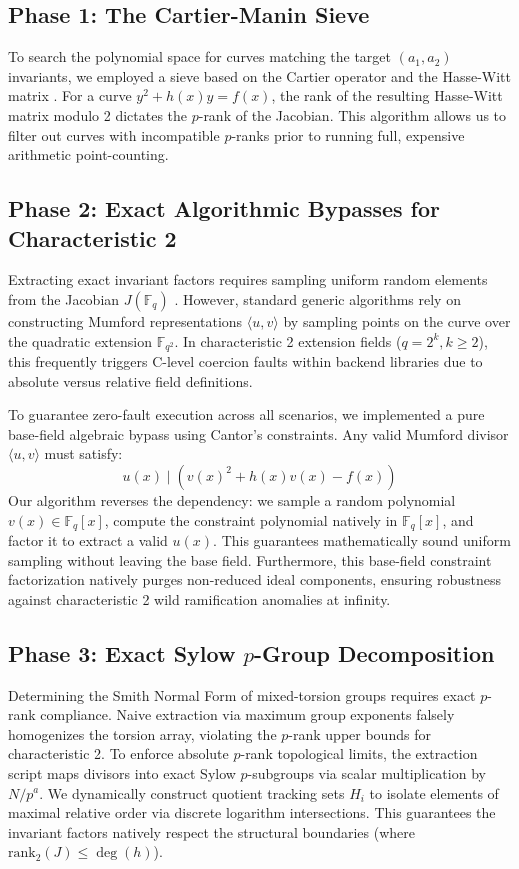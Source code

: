 \documentclass[letterpaper, 11pt]{article}
\begin{document}
\subsection{Phase 1: The Cartier-Manin Sieve}
To search the polynomial space for curves matching the target $(a_1, a_2)$ invariants, we employed a sieve based on the Cartier operator \cite{Cartier1958} and the Hasse-Witt matrix \cite{Manin1963}. For a curve $y^2 + h(x)y = f(x)$, the rank of the resulting Hasse-Witt matrix modulo 2 dictates the $p$-rank of the Jacobian. This algorithm allows us to filter out curves with incompatible $p$-ranks prior to running full, expensive arithmetic point-counting.

\subsection{Phase 2: Exact Algorithmic Bypasses for Characteristic 2}
Extracting exact invariant factors requires sampling uniform random elements from the Jacobian $J(\mathbb{F}_q)$ \cite{Sutherland2007}. However, standard generic algorithms rely on constructing Mumford representations $\langle u, v \rangle$ \cite{Cantor1987} by sampling points on the curve over the quadratic extension $\mathbb{F}_{q^2}$. In characteristic 2 extension fields ($q = 2^k, k \ge 2$), this frequently triggers C-level coercion faults within backend libraries due to absolute versus relative field definitions.

To guarantee zero-fault execution across all scenarios, we implemented a pure base-field algebraic bypass using Cantor's constraints. Any valid Mumford divisor $\langle u, v \rangle$ must satisfy:
\begin{equation}
    u(x) \mid \left( v(x)^2 + h(x)v(x) - f(x) \right)
\end{equation}
Our algorithm reverses the dependency: we sample a random polynomial $v(x) \in \mathbb{F}_q[x]$, compute the constraint polynomial natively in $\mathbb{F}_q[x]$, and factor it to extract a valid $u(x)$. This guarantees mathematically sound uniform sampling without leaving the base field. Furthermore, this base-field constraint factorization natively purges non-reduced ideal components, ensuring robustness against characteristic 2 wild ramification anomalies at infinity.

\subsection{Phase 3: Exact Sylow \texorpdfstring{$p$}{p}-Group Decomposition}
Determining the Smith Normal Form of mixed-torsion groups requires exact $p$-rank compliance. Naive extraction via maximum group exponents falsely homogenizes the torsion array, violating the $p$-rank upper bounds for characteristic 2. To enforce absolute $p$-rank topological limits, the extraction script maps divisors into exact Sylow $p$-subgroups via scalar multiplication by $N/p^a$. We dynamically construct quotient tracking sets $H_i$ to isolate elements of maximal relative order via discrete logarithm intersections. This guarantees the invariant factors natively respect the structural boundaries (where $\text{rank}_2(J) \le \deg(h)$). 
\end{document}
